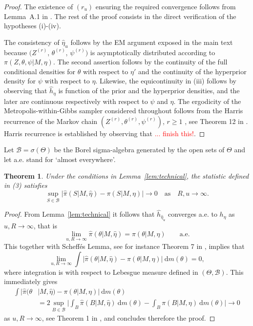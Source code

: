 \documentclass[11pt]{amsart}
\newtheorem{theorem}{Theorem}
\theoremstyle{definition}
\theoremstyle{remark}
\begin{document}
\begin{proof} The existence of $(r_u)$ ensuring the required
convergence follows from Lemma~A.1 in \cite{C01}.  The rest of the
proof consists in the direct verification of the hypotheses (i)-(iv). 


The consistency of $\hat\eta_u$ follows by the EM argument exposed in
the main text because $(Z^{(r)}$, $\theta^{(r)}$, $\psi^{(r)})$ is 
asymptotically distributed according to $\pi(Z, \theta, \psi|M,
\eta)$. The second assertion follows by the continuity of the full 
conditional densities for $\theta$ with respect to $\eta'$
and the continuity of the hyperprior density for  $\psi$ with respect
to $\eta$. Likewise, the equicontinuity in (iii) follows 
by observing that $\widehat h_\eta$ is function of the prior and the
hyperprior densities, and the later are continuous respectively with
respect to $\psi$ and $\eta$. The ergodicity of the
Metropolis-within-Gibbs sampler considered throughout follows from the
Harris recurrence of the Markov chain $(Z^{(r)}, \theta^{(r)},  \psi^{(r)})$, $r \geqslant 1$ , see Theorem
12 in \cite{RR}. Harris recurrence is established by observing that
\textcolor{red}{... finish this!}.
\end{proof}

Let $\mathcal B = \sigma(\Theta)$ be the Borel sigma-algebra generated  
by the open sets of $\Theta$ and let a.e. stand for `almost everywhere'.

\begin{theorem} Under the conditions in Lemma~\ref{lem:technical},
  the statistic defined in \textup{(3)} satisfies
\[
  \sup_{S \in  \mathcal B} 
     \big| 
         \hat\pi(S|M, \hat\eta) -  \pi(S|M, \eta)
     \big| \to 0 \quad \text{as}\quad R, u \to \infty.
\]
\end{theorem}
\begin{proof}
From Lemma~\ref{lem:technical} it follows that $\widehat h_{\hat\eta_u}$
converges a.e. to $h_\eta$ as $u, R \to \infty$, that is
\[
  \lim_{u, R \to \infty} \widehat\pi(\theta|M, \hat\eta) 
  =
  \pi(\theta|M,\eta)\qquad\text{a.e.}
\]
This together with Scheff\'es Lemma, see for instance Theorem 7 in
\cite{DG}, implies that 
\[
  \lim_{u, R \to \infty} 
  \int \big|\widehat\pi(\theta|M, \hat\eta) - \pi(\theta|M,
  \eta)\big|\ \text{d}m(\theta) 
  =  
  0,
\]
where integration is with respect to Lebesgue measure defined in
$(\Theta, \mathcal B)$. This immediately gives
\begin{align*}
  \int \big|\widehat\pi(\theta &| M, \hat\eta) 
   - 
  \pi(\theta|M, \eta)\big|\ \text{d}m(\theta)                \\
  &=
  2 \sup_{B \in \mathcal B}\Bigg|
      \int_B \widehat\pi(B|M, \hat\eta)\ \text{d}m(\theta) 
      -
      \int_B \pi(B|M, \eta)\ \text{d}m(\theta)
   \Big| \to 0
\end{align*}
as $u, R \to \infty$, see Theorem 1 in \cite{DG}, and concludes
therefore the proof. 
\end{proof}
\end{document}
